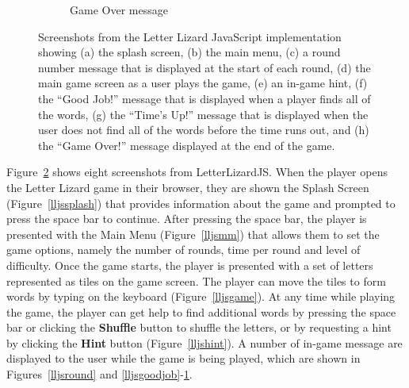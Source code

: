 \begin{figure}
\begin{subfigure}{0.49\textwidth}
        \caption{Game Over message}
        \label{lljsgameover}
    \end{subfigure}
    \caption[Screenshots from the Letter Lizard JavaScript implementation]
    {Screenshots from the Letter Lizard JavaScript implementation showing
    (a) the splash screen, (b) the main menu, (c) a round number message that is 
    displayed at the start of each round, (d) the main game screen as a user plays
    the game, (e) an in-game hint, (f) the ``Good Job!'' message that is displayed when
    a player finds all of the words, (g) the ``Time's Up!'' message that is displayed
    when the user does not find all of the words before the time runs out, and (h)
    the ``Game Over!'' message displayed at the end of the game.}
    \label{lljsscreenshots}
\end{figure}

Figure~\ref{lljsscreenshots} shows eight screenshots from LetterLizardJS. When the player
opens the Letter Lizard game in their browser, they are shown the Splash Screen
(Figure~\ref{lljssplash}) that provides information about the game and prompted to
press the space bar to continue. After pressing the space bar, the player is presented
with the Main Menu (Figure~\ref{lljsmm}) that allows them to set the game options, namely
the number of rounds, time per round and level of difficulty. Once the game starts,
the player is presented with a set of letters represented as tiles on the game screen.
The player can move the tiles to form words by typing on the keyboard (Figure~\ref{lljsgame}).
At any time while playing the game, the player can get help to find additional words
by pressing the space bar or clicking the \textbf{Shuffle} button to shuffle the letters,
or by requesting a hint by clicking the \textbf{Hint} button (Figure~\ref{lljshint}).
A number of in-game message are displayed to the user while the game is being played,
which are shown in Figures~\ref{lljsround} and \ref{lljsgoodjob}-\ref{lljsgameover}.

